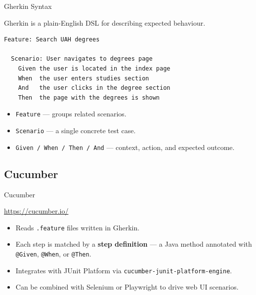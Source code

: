 \documentclass[11pt, xcolor=svgnames]{beamer}
\providecommand{\alert}[1]{\textbf{#1}}
\begin{document}
\begin{frame}[fragile]{Gherkin Syntax}

Gherkin is a plain-English DSL for describing expected behaviour.

\begin{lstlisting}[language={}]
Feature: Search UAH degrees

  Scenario: User navigates to degrees page
    Given the user is located in the index page
    When  the user enters studies section
    And   the user clicks in the degree section
    Then  the page with the degrees is shown
\end{lstlisting}

\begin{itemize}
  \item \texttt{Feature} --- groups related scenarios.
  \item \texttt{Scenario} --- a single concrete test case.
  \item \texttt{Given / When / Then / And} --- context, action, and expected outcome.
\end{itemize}

\end{frame}


\subsection{Cucumber}


\begin{frame}{Cucumber}

\begin{block}{}
  \centering \url{https://cucumber.io/}
\end{block}

\begin{itemize}
  \item Reads \texttt{.feature} files written in Gherkin.
  \item Each step is matched by a \alert{step definition} --- a Java method annotated with \texttt{@Given}, \texttt{@When}, or \texttt{@Then}.
  \item Integrates with JUnit Platform via \texttt{cucumber-junit-platform-engine}.
  \item Can be combined with Selenium or Playwright to drive web UI scenarios.
\end{itemize}

\end{frame}
\end{document}
